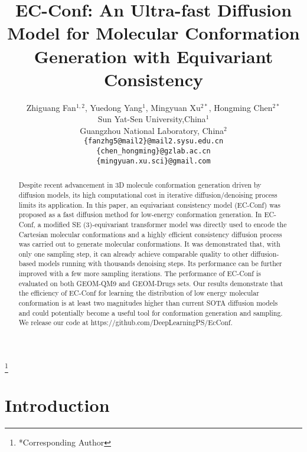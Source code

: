 \documentclass{article} %
\title{EC-Conf: An Ultra-fast Diffusion Model for Molecular Conformation Generation with Equivariant Consistency}
\author{Zhiguang Fan$^{1,2}$, Yuedong Yang$^1$, Mingyuan Xu$^{2*}$, Hongming Chen$^{2*}$  \\
Sun Yat-Sen University,China$^1$\\
Guangzhou National Laboratory, China$^2$\\
\texttt{\{fanzhg5@mail2\}@mail2.sysu.edu.cn} \\
\texttt{\{chen\_hongming\}@gzlab.ac.cn} \\
\texttt{\{mingyuan.xu.sci\}@gmail.com} \\
}
\newcommand\blfootnote[1]{%
	\begingroup
	\renewcommand\thefootnote{}\footnote{#1}%
	\addtocounter{footnote}{-1}%
	\endgroup
}
\begin{document}
\blfootnote{*Corresponding Author}  %

\maketitle



\begin{abstract}
Despite recent advancement in 3D molecule conformation generation driven by diffusion models, its high computational cost in iterative diffusion/denoising process limits its application. In this paper, an equivariant consistency model (EC-Conf) was proposed as a fast diffusion method for low-energy conformation generation. In EC-Conf, a modified SE (3)-equivariant transformer model was directly used to encode the Cartesian molecular conformations and a highly efficient consistency diffusion process was carried out to generate molecular conformations. It was demonstrated that, with only one sampling step, it can already achieve comparable quality to other diffusion-based models running with thousands denoising steps. Its performance can be further improved with a few more sampling iterations. The performance of EC-Conf is evaluated on both GEOM-QM9 and GEOM-Drugs sets. Our results demonstrate that the efficiency of EC-Conf for learning the distribution of low energy molecular conformation is at least two magnitudes higher than current SOTA diffusion models and could potentially become a useful tool for conformation generation and sampling. We release our code at {https://github.com/DeepLearningPS/EcConf}. %


\end{abstract}


\section{Introduction}
\end{document}
